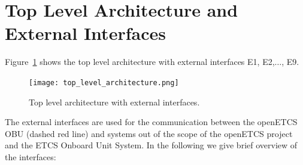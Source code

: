 \section{Top Level Architecture and External Interfaces}
Figure~\ref{f:top_level} shows the top level architecture with external interfaces E1, E2,$\ldots$, E9.
\begin{figure}
\centering
\texttt{[image: top\_level\_architecture.png]}
\caption{Top level architecture with external interfaces.}
\label{f:top_level}
\end{figure}
The external interfaces are used for the communication between the openETCS OBU (dashed red line) and systems out of the scope of the openETCS project and the ETCS Onboard Unit System. In the following we give  brief overview of the interfaces:

